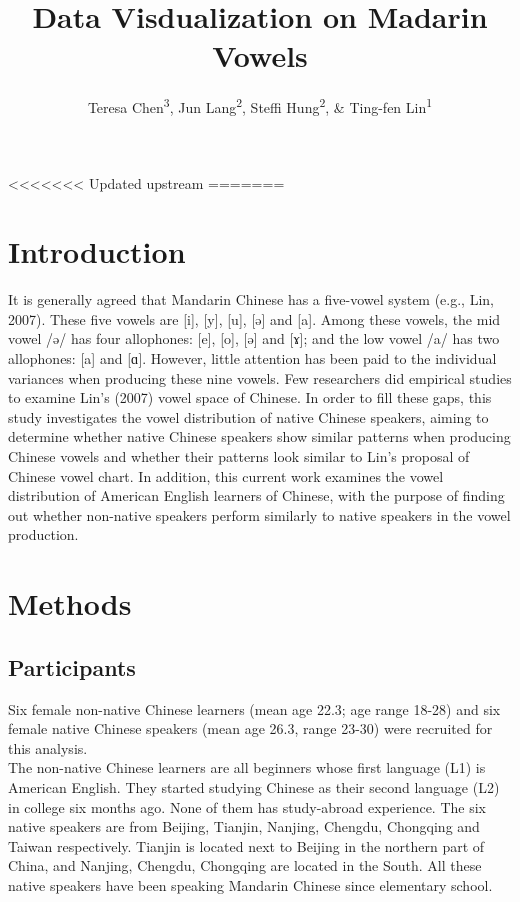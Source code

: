 \documentclass[man, fleqn, noextraspace]{apa6}
\title{Data Visdualization on Madarin Vowels}
\author{Teresa Chen\textsuperscript{3}, Jun Lang\textsuperscript{2}, Steffi
Hung\textsuperscript{2}, \& Ting-fen Lin\textsuperscript{1}}
\date{}
\affiliation{
\vspace{0.5cm}
\textsuperscript{1} Department of Human Physiology\\\textsuperscript{2} Department of East Asia Linguistic Language\\\textsuperscript{3} Department of Communication Disorder}
\begin{document}
\maketitle

{
\setcounter{tocdepth}{5}
\tableofcontents
}
\newpage

<<<<<<< Updated upstream
=======
\section{Introduction}\label{introduction}

It is generally agreed that Mandarin Chinese has a five-vowel system
(e.g., Lin, 2007). These five vowels are {[}i{]}, {[}y{]}, {[}u{]},
{[}ə{]} and {[}a{]}. Among these vowels, the mid vowel /ə/ has four
allophones: {[}e{]}, {[}o{]}, {[}ə{]} and {[}ɤ{]}; and the low vowel /a/
has two allophones: {[}a{]} and {[}ɑ{]}. However, little attention has
been paid to the individual variances when producing these nine vowels.
Few researchers did empirical studies to examine Lin's (2007) vowel
space of Chinese. In order to fill these gaps, this study investigates
the vowel distribution of native Chinese speakers, aiming to determine
whether native Chinese speakers show similar patterns when producing
Chinese vowels and whether their patterns look similar to Lin's proposal
of Chinese vowel chart. In addition, this current work examines the
vowel distribution of American English learners of Chinese, with the
purpose of finding out whether non-native speakers perform similarly to
native speakers in the vowel production.

\section{Methods}\label{methods}

\subsection{Participants}\label{participants}

Six female non-native Chinese learners (mean age 22.3; age range 18-28)
and six female native Chinese speakers (mean age 26.3, range 23-30) were
recruited for this analysis.\\
The non-native Chinese learners are all beginners whose first language
(L1) is American English. They started studying Chinese as their second
language (L2) in college six months ago. None of them has study-abroad
experience. The six native speakers are from Beijing, Tianjin, Nanjing,
Chengdu, Chongqing and Taiwan respectively. Tianjin is located next to
Beijing in the northern part of China, and Nanjing, Chengdu, Chongqing
are located in the South. All these native speakers have been speaking
Mandarin Chinese since elementary school.
\end{document}
